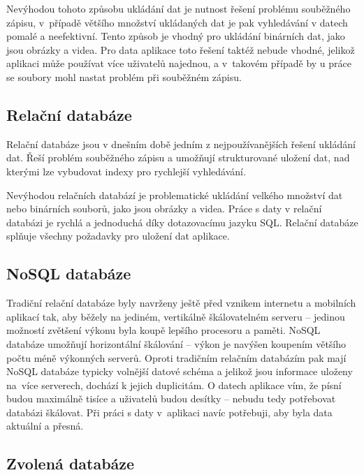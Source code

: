 Nevýhodou tohoto způsobu ukládání dat je nutnost řešení problému souběžného zápisu, v~případě většího množství ukládaných dat je pak vyhledávání v datech pomalé a neefektivní. Tento způsob je vhodný pro ukládání binárních dat, jako jsou obrázky a videa. Pro data aplikace toto řešení taktéž nebude vhodné, jelikož aplikaci může používat více uživatelů najednou, a v~takovém případě by u práce se soubory mohl nastat problém při souběžném zápisu.

\subsection{Relační databáze}

Relační databáze jsou v dnešním době jedním z nejpoužívanějších řešení ukládání dat. Řeší problém souběžného zápisu a umožňují strukturované uložení dat, nad kterými lze vybudovat indexy pro rychlejší vyhledávání. \cite{what-is-rdbms}

Nevýhodou relačních databází je problematické ukládání velkého množství dat nebo binárních souborů, jako jsou obrázky a videa. Práce s daty v relační databázi je rychlá a jednoduchá díky dotazovacímu jazyku SQL. Relační databáze splňuje všechny požadavky pro uložení dat aplikace.

\subsection{NoSQL databáze}

Tradiční relační databáze byly navrženy ještě před vznikem internetu a mobilních aplikací tak, aby běžely na jediném, vertikálně škálovatelném serveru -- jedinou možností zvětšení výkonu byla koupě lepšího procesoru a paměti. NoSQL databáze umožňují horizontální škálování -- výkon je navýšen koupením většího počtu méně výkonných serverů. Oproti tradičním relačním databázím pak mají NoSQL databáze typicky volnější datové schéma a jelikož jsou informace uloženy na~více serverech, dochází k jejich duplicitám. \cite{why-nosql} O datech aplikace vím, že písní budou maximálně tisíce a uživatelů budou desítky -- nebudu tedy potřebovat databázi škálovat. Při práci s daty v~aplikaci navíc potřebuji, aby byla data aktuální a přesná.

\subsection{Zvolená databáze}

